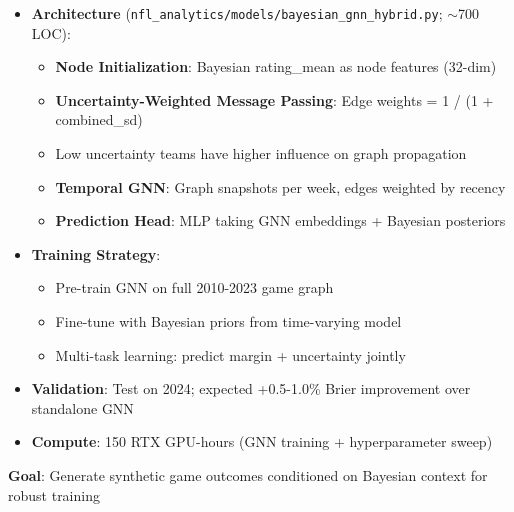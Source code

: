 \begin{itemize}
  \item {} \textbf{Architecture} (\texttt{nfl\_analytics/models/bayesian\_gnn\_hybrid.py}; $\sim$700 LOC):
  \begin{itemize}
    \item \textbf{Node Initialization}: Bayesian rating\_mean as node features (32-dim)
    \item \textbf{Uncertainty-Weighted Message Passing}: Edge weights = 1 / (1 + combined\_sd)
    \item Low uncertainty teams have higher influence on graph propagation
    \item \textbf{Temporal GNN}: Graph snapshots per week, edges weighted by recency
    \item \textbf{Prediction Head}: MLP taking GNN embeddings + Bayesian posteriors
  \end{itemize}
  \item {} \textbf{Training Strategy}:
  \begin{itemize}
    \item Pre-train GNN on full 2010-2023 game graph
    \item Fine-tune with Bayesian priors from time-varying model
    \item Multi-task learning: predict margin + uncertainty jointly
  \end{itemize}
  \item {} \textbf{Validation}: Test on 2024; expected +0.5-1.0\% Brier improvement over standalone GNN
  \item \textbf{Compute}: 150 RTX GPU-hours (GNN training + hyperparameter sweep)
\end{itemize}

\textbf{Goal}: Generate synthetic game outcomes conditioned on Bayesian context for robust training

